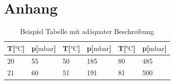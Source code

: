 \documentclass[12pt]{article}
\begin{document}
\section{Anhang}\label{sec:anhang}
\begin{table}[H]
  \centering
  \caption{Beispiel Tabelle mit adäquater Beschreibung}\label{tab:1}
  \begin{tabular}{ll|ll|ll}
      \textbf{T}[$\si{\degreeCelsius}$] & \textbf{p}[$\si{\milli\bar}$] & \textbf{T}[$\si{\degreeCelsius}$] & \textbf{p}[$\si{\milli\bar}$] & \textbf{T}[$\si{\degreeCelsius}$] & \textbf{p}[$\si{\milli\bar}$] \\ \hline
      20 & 55  & 50 & 185 & 80 & 485 \\
      21 & 60  & 51 & 191 & 81 & 500 \\
      \hline
  \end{tabular}
\end{table}
\end{document}
